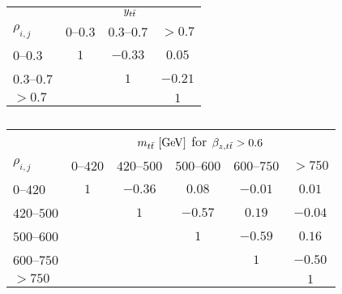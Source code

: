 \begin{table}[!htp]\centering
\begin{tabular}{l c c c }
  \toprule
  &\multicolumn{3}{c}{$y_{t\bar{t}}{}$}    \\
  $\rho_{i,j}$      &  $0$--$0.3$   &  $0.3$--$0.7$  &  $>0.7$  \\
  \midrule
  $0$--$0.3$    &   $1$   &   $-0.33$  &   $0.05$   \\
  $0.3$--$0.7$  &         &   $1$      &   $-0.21$  \\
  $>0.7$        &         &            &   $1$      \\
  \bottomrule
\end{tabular}
\caption{ }
\label{tab:corr_ytt}
\end{table}

\begin{table}[!htp]\centering
\begin{tabular}{l c c c c c }
  \toprule
  &\multicolumn{5}{c}{$m_{t\bar{t}}{}~[\rm{GeV}]$ for $\beta_{z,t\bar{t}}{}> 0.6$}    \\
  $\rho_{i,j}$ & $0$--$420$ & $420$--$500$ & $500$--$600$ & $600$--$750$ & $>750$ \\
  \midrule
  $0$--$420$      & $1$ & $-0.36$ & $0.08$  & $-0.01$ & $0.01$  \\
  $420$--$500$    &     & $1$     & $-0.57$ & $0.19$  & $-0.04$ \\
  $500$--$600$    &     &         & $1$     & $-0.59$ & $0.16$  \\
  $600$--$750$    &     &         &         & $1$     & $-0.50$ \\
  $>750$          &     &         &         &         & $1$     \\
  \bottomrule
\end{tabular}
\caption{ }
\label{tab:corr_mtt_beta}
\end{table}
